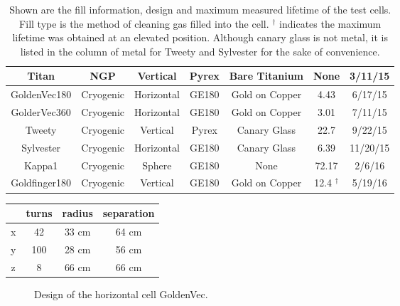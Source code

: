 \documentclass[pdftex,letterpaper,12pt]{report}
\begin{document}
\begin{table}
\begin{center}
\begin{tabular}{|c|c|c|c|c|c|c|}
			Titan & NGP & Vertical & Pyrex & Bare Titanium & None & 3/11/15\\ \hline
			GoldenVec180 & Cryogenic & Horizontal & GE180 & Gold on Copper & 4.43 & 6/17/15\\ \hline
			GolderVec360 & Cryogenic & Horizontal & GE180 & Gold on Copper & 3.01 & 7/11/15\\ \hline
			Tweety & Cryogenic & Vertical & Pyrex & Canary Glass & 22.7 & 9/22/15 \\ \hline
			Sylvester & Cryogenic & Horizontal & GE180 & Canary Glass & 6.39 & 11/20/15\\ \hline
			Kappa1 & Cryogenic & Sphere & GE180 & None & 72.17 & 2/6/16\\ \hline
			Goldfinger180 & Cryogenic & Vertical & GE180 & Gold on Copper & 12.4 $^\dagger$ & 5/19/16\\ \hline
		\end{tabular}
		\caption
		{Shown are the fill information, design and maximum measured lifetime of the test cells. Fill type is the method of cleaning gas filled into the cell. $^\dagger$ indicates the maximum lifetime was obtained at an elevated position. Although canary glass is not metal, it is listed in the column of metal for Tweety and Sylvester for the sake of convenience.}
		\label{test_cells}
	\end{center}
\end{table}

\begin{center}
	\begin{tabular}{ | c | c| c| c | }
		\hline
		& turns & radius & separation \\ \hline
		x & 42 & 33 cm & 64 cm \\ \hline 
		y & 100 & 28 cm & 56 cm \\ \hline
		z & 8 & 66 cm & 66 cm \\
		\hline
	\end{tabular}
\end{center}

\begin{figure}[t!]
	\centering
	\caption{{Design of the horizontal cell GoldenVec.}}
	\label{goldenvec}
\end{figure}
\end{document}

